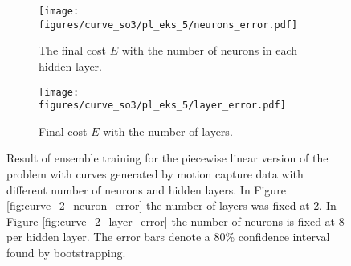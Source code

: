 \begin{figure}[t]\label{fig:curve_so3_pl_eks}
    \begin{subfigure}[t]{0.5\textwidth}
        \centering
        \texttt{[image: figures/curve\_so3/pl\_eks\_5/neurons\_error.pdf]}
        \caption{The final cost \(E\) with the number of neurons in each hidden layer.}
        \label{fig:curve_so3_pl_neuron_error}
    \end{subfigure}
    \begin{subfigure}[t]{0.5\textwidth}
        \centering
        \texttt{[image: figures/curve\_so3/pl\_eks\_5/layer\_error.pdf]}
        \caption{Final cost \(E\) with the number of layers.}
        \label{fig:curve_so3_pl_layer_error}
    \end{subfigure}
    \caption{Result of ensemble training for the piecewise linear version of the problem with curves generated by motion capture data with different number of neurons and hidden layers. In Figure \ref{fig:curve_2_neuron_error} the number of layers was fixed at 2. In Figure \ref{fig:curve_2_layer_error} the number of neurons is fixed at 8 per hidden layer. The error bars denote a 80\% confidence interval found by bootstrapping.}
\end{figure}

